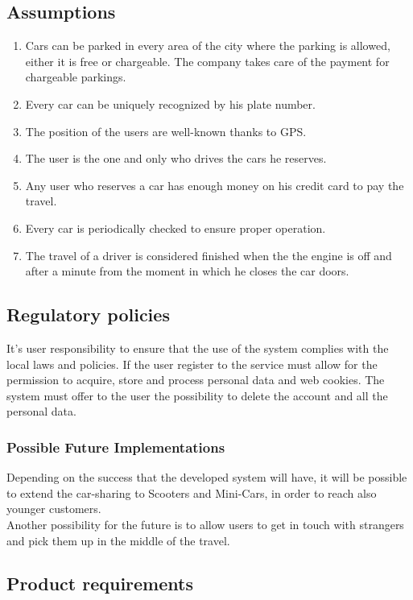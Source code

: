 \documentclass[english]{article}
\newcounter{requirement}
\begin{document}
\subsection{Assumptions}
\begin{enumerate}
	\item Cars can be parked in every area of the city where the parking is allowed, either it is free or chargeable. The company 		                    takes care of the payment for chargeable parkings. 
	\item Every car can be uniquely recognized by his plate number.
	\item The position of the users are well-known thanks to GPS.
	\item The user is the one and only who drives the cars he reserves.
	\item Any user who reserves a car has enough money on his credit card to pay the travel.
	\item Every car is periodically checked to ensure proper operation.
	\item The travel of a driver is considered finished when the the engine is off and after a minute from the moment in which he closes the car doors.
\end{enumerate}

\subsection{Regulatory policies}
It’s user responsibility to ensure that the use of the system complies with the local laws and policies. If the user register to the service must allow for the permission to acquire, store and process personal data and web cookies. The system must offer to the user the possibility to delete the account and all the personal data.


\subsubsection{Possible Future Implementations}
Depending on the success that the developed system will have, it will be possible to extend the car-sharing to Scooters and Mini-Cars, in order to reach also younger customers.
\\ \noindent 
Another possibility for the future is to allow users to get in touch with strangers and pick them up in the middle of the travel.
\pagebreak{}

\subsection{Product requirements}
\end{document}

